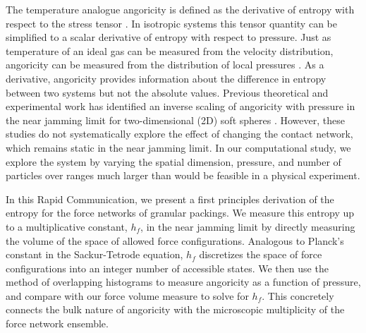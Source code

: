 The temperature analogue angoricity is defined as the derivative of entropy with respect to the stress tensor
\cite{edwards_distribution_2008}. In isotropic systems this tensor quantity can be simplified to a scalar derivative of entropy with respect to pressure. Just as temperature of an ideal gas can be measured from the velocity distribution, angoricity can be measured from the distribution of local pressures \cite{bililign_protocol_2019}. As a derivative, angoricity provides information about the difference in entropy between two systems but not the absolute values. Previous theoretical and experimental work has identified an inverse scaling of angoricity with pressure in the near jamming limit for two-dimensional (2D) soft spheres \cite{henkes_statistical_2009,bililign_protocol_2019}. However, these studies do not systematically explore the effect of changing the contact network, which remains static in the near jamming limit. In our computational study, we explore the system by varying the spatial dimension, pressure, and number of particles over ranges much larger than would be feasible in a physical experiment.

In this Rapid Communication, we present a first principles derivation of the entropy for the force networks of granular packings.  We measure this entropy up to a multiplicative constant, $h_f$, in the near jamming limit by directly measuring the volume of the space of allowed force configurations.  Analogous to Planck's constant in the Sackur-Tetrode equation, $h_f$ discretizes the space of force configurations into an integer number of accessible states.  We then use the method of overlapping histograms to measure angoricity as a function of pressure, and compare with our force volume measure to solve for $h_f$. This concretely connects the bulk nature of angoricity with the microscopic multiplicity of the force network ensemble.

